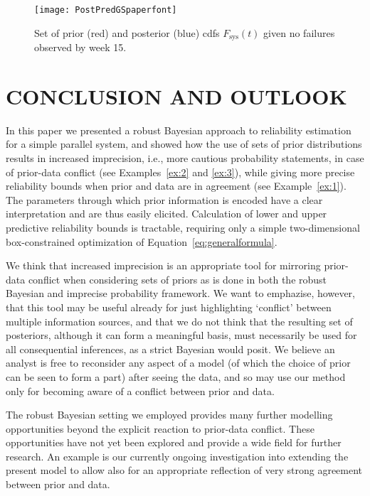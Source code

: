 \documentclass[12pt,a4paper,twocolumn,fleqn]{narms}
\begin{document}
\begin{figure}
\texttt{[image: PostPredGSpaperfont]}
\caption{Set of prior (red) and posterior (blue) cdfs $F_\text{sys}(t)$ given no failures observed by week 15.}
\label{fig:examplenofailures}
\end{figure}

\section{CONCLUSION AND OUTLOOK}
\label{sec:conclusion}

In this paper we presented a robust Bayesian approach to reliability estimation for a simple parallel system,
and showed how the use of sets of prior distributions results in increased imprecision,
i.e., more cautious probability statements, in case of prior-data conflict (see Examples~\ref{ex:2} and \ref{ex:3}),
while giving more precise reliability bounds when prior and data are in agreement (see Example~\ref{ex:1}).
The parameters through which prior information is encoded have a clear interpretation
and are thus easily elicited.
Calculation of lower and upper predictive reliability bounds is tractable,
requiring only a simple two-dimensional box-constrained optimization of Equation~\eqref{eq:generalformula}.

We think that increased imprecision is an appropriate tool for mirroring prior-data conflict
when considering sets of priors as is done in both the robust Bayesian and imprecise probability framework.
We want to emphazise, however, that this tool may be useful already
for just highlighting `conflict' between multiple information sources,
and that we do not think that the resulting set of posteriors,
although it can form a meaningful basis, must necessarily be used
for all consequential inferences, as a strict Bayesian would posit.
We believe an analyst is free to reconsider any aspect of a model
(of which the choice of prior can be seen to form a part) after seeing the data,
and so may use our method only for becoming aware of a conflict between prior and data.

The robust Bayesian setting we employed provides many further modelling opportunities
beyond the explicit reaction to prior-data conflict.
These opportunities have not yet been explored and
provide a wide field for further research.
An example is our currently ongoing investigation into
extending the present model to allow also for an appropriate reflection of very strong agreement between prior and data.
\end{document}

